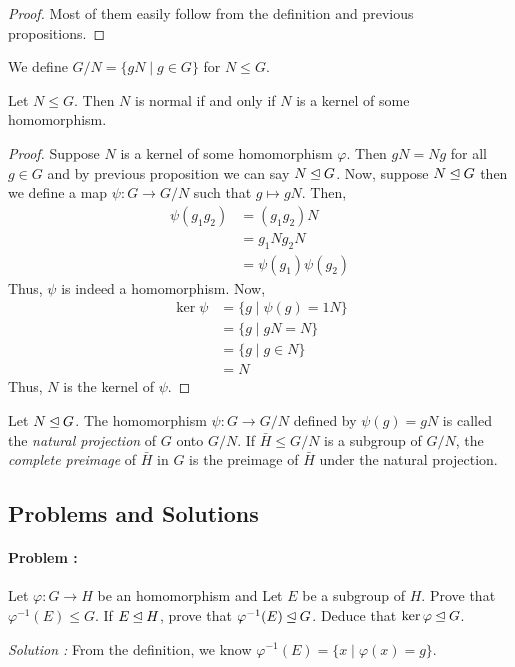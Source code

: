\begin{proof}
    Most of them easily follow from the definition and previous propositions.
\end{proof}

\begin{definition}
    We define $G/N=\{gN \mid g \in G\}$ for $N \le G$.
\end{definition}

\begin{proposition}
    Let $N \le G$. Then $N$ is normal if and only if $N$ is a kernel of some homomorphism.
\end{proposition}

\begin{proof}
    Suppose $N$ is a kernel of some homomorphism $\varphi$. Then $gN = Ng$ for all $g \in G$ and by previous proposition we can say 
    $N \unlhd G$. Now, suppose $N \unlhd G$ then we define a map $\psi : G \to G/N$ such that $g \mapsto gN$.
    Then,
    \begin{align*}
        \psi(g_1 g_2) &= (g_1 g_2)N \\
        &= g_1 N g_2 N \\
        &= \psi(g_1) \psi(g_2)
    \end{align*}
    Thus, $\psi$ is indeed a homomorphism. Now,
    \begin{align*}
        \ker \psi &= \{ g \mid \psi(g) = 1 N\} \\
        &= \{ g \mid gN = N \} \\
        &= \{ g \mid g \in N\} \\
        &= N
    \end{align*}
    Thus, $N$ is the kernel of $\psi$.
\end{proof}

\begin{definition}
    Let $N \unlhd G$. The homomorphism $\psi : G \to G/N$ defined by $\psi(g)=gN$ is called the \textit{natural projection} of $G$ onto
    $G/N$. If $\bar{H} \le G/N$ is a subgroup of $G/N$, the \textit{complete preimage} of $\bar{H}$ in $G$ is the preimage of $\bar{H}$
    under the natural projection.
\end{definition}

\eject

\subsection*{Problems and Solutions}

\paragraph{Problem :} Let $\varphi : G \to H$ be an homomorphism and Let $E$ be a subgroup of $H$. Prove that $\varphi^{-1}(E) \le G$.
If $E \unlhd H$, prove that $\varphi^{-1}(E) \unlhd G$. Deduce that $\ker \varphi \unlhd G$.

\vspace{4mm}
\textit{Solution :} From the definition, we know $\varphi^{-1}(E) = \{x \mid \varphi(x) = g\}$. 